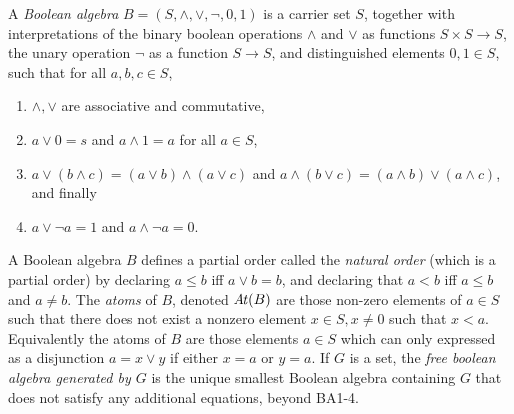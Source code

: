 \documentclass[subfiles]{the-pdg-manual.tex}
\begin{document}
\begin{defn}
	A \emph{Boolean algebra} $B = (S, \land,\lor,\lnot,0,1)$ is a carrier set $S$, together with interpretations of the binary boolean operations $\land $ and $\lor$ as functions $S\times S \to S$, the unary operation $\lnot$ as a function $S \to S$, and distinguished elements $0, 1 \in S$, such that for all $a, b, c \in S$,
	\begin{enumerate}[itemsep=0pt, parsep=1pt,label={BA\arabic*.}]
		\item $\land, \lor$ are associative and commutative,
		\item $a \lor 0 = s$ and $a \land 1 = a$ for all $a \in S$,
		\item $a \lor(b \land c) = (a \lor b) \land (a \lor c)$ and $a \land(b \lor c) = (a \land b) \lor (a \land c)$,  and finally
		\item $a \lor \lnot a = 1$ and $a \land \lnot a = 0$.
	\end{enumerate}
	A Boolean algebra $B$ defines a partial order called the \emph{natural order} (which is a partial order) by declaring $a \leq b$ iff $a \lor b = b$, and declaring that $a < b$ iff $a \leq b$ and $a \neq b$.
	The \emph{atoms} of $B$, denoted $\mathit{A\mkern-2mu t}(B)$ are those non-zero elements of $a \in S$ such that there does not exist a nonzero element $x \in S, x \ne 0$ such that $x < a$. Equivalently the atoms of $B$ are those elements $a\in S$ which can only expressed as a disjunction $a = x \lor y$ if either $x = a$ or $y=a$.
	If $G$ is a set, the \emph{free boolean algebra generated by $G$} is the unique smallest Boolean algebra containing $G$ that does not satisfy any additional equations, beyond {BA1-4}.
\end{defn}
\end{document}
